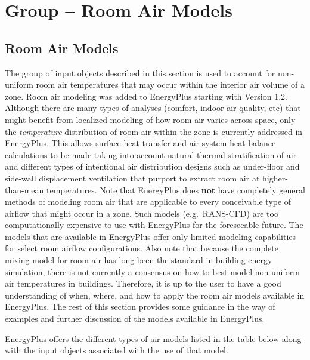 \section{Group -- Room Air Models}\label{group-room-air-models}

\subsection{Room Air Models}\label{room-air-models}

The group of input objects described in this section is used to account for non-uniform room air temperatures that may occur within the interior air volume of a zone. Room air modeling was added to EnergyPlus starting with Version 1.2. Although there are many types of analyses (comfort, indoor air quality, etc) that might benefit from localized modeling of how room air varies across space, only the \emph{temperature} distribution of room air within the zone is currently addressed in EnergyPlus. This allows surface heat transfer and air system heat balance calculations to be made taking into account natural thermal stratification of air and different types of intentional air distribution designs such as under-floor and side-wall displacement ventilation that purport to extract room air at higher-than-mean temperatures. Note that EnergyPlus does \textbf{not} have completely general methods of modeling room air that are applicable to every conceivable type of airflow that might occur in a zone. Such models (e.g.~RANS-CFD) are too computationally expensive to use with EnergyPlus for the foreseeable future. The models that are available in EnergyPlus offer only limited modeling capabilities for select room airflow configurations. Also note that because the complete mixing model for room air has long been the standard in building energy simulation, there is not currently a consensus on how to best model non-uniform air temperatures in buildings. Therefore, it is up to the user to have a good understanding of when, where, and how to apply the room air models available in EnergyPlus. The rest of this section provides some guidance in the way of examples and further discussion of the models available in EnergyPlus.

EnergyPlus offers the different types of air models listed in the table below along with the input objects associated with the use of that model.

